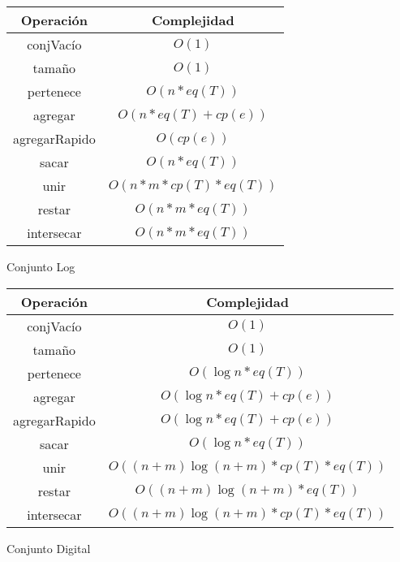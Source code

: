 \documentclass{article}
\begin{document}
\begin{multicols}{2}
\begin{center}
	\begin{tabular}{|c|c|}
		\hline
		\textbf{Operación} & \textbf{Complejidad} \\
		\hline
		conjVacío & $O(1)$ \\
		tamaño & $O(1)$ \\
		pertenece & $O(n * eq(T))$ \\
		agregar & $O(n * eq(T) + cp(e))$ \\
		agregarRapido & $O(cp(e))$ \\
		sacar & $O(n * eq(T))$ \\
		unir & $O(n * m * cp(T) * eq(T))$ \\
		restar & $O(n * m * eq(T))$ \\
		intersecar & $O(n * m * eq(T))$ \\
		\hline
	\end{tabular}
\end{center}


\begin{center}
	\begin{large}Conjunto Log\end{large}
	\vspace*{2mm}
	
	\begin{tabular}{|c|c|}
		\hline
		\textbf{Operación} & \textbf{Complejidad} \\
		\hline
		conjVacío & $O(1)$ \\
		tamaño & $O(1)$ \\
		pertenece & $O(\log n * eq(T))$ \\
		agregar & $O(\log n * eq(T) + cp(e))$ \\
		agregarRapido & $O(\log n * eq(T) + cp(e))$ \\
		sacar & $O(\log n * eq(T))$ \\
		unir & $O((n + m)\log (n + m) * cp(T) * eq(T))$ \\
		restar & $O((n + m)\log (n + m) * eq(T))$ \\
		intersecar & $O((n + m)\log (n + m) * cp(T) * eq(T))$ \\
		\hline
	\end{tabular}
\end{center}


\begin{center}
	\begin{large}Conjunto Digital\end{large}
	\vspace*{2mm}
	

\end{center}
\end{multicols}
\end{document}
